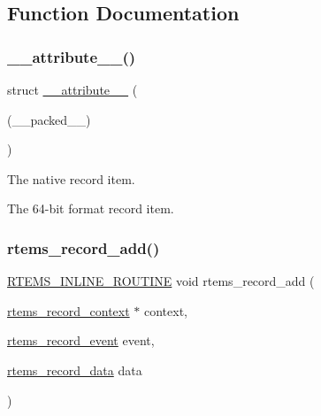 \subsection{Function Documentation}
\mbox{\label{group__RTEMSRecord_gad09246453a4dabd919c7541484046a87}} 
\subsubsection{\texorpdfstring{\_\_attribute\_\_()}{\_\_attribute\_\_()}}
{\footnotesize\ttfamily struct \mbox{\hyperlink{struct____attribute____}{\+\_\+\+\_\+attribute\+\_\+\+\_\+}} (\begin{DoxyParamCaption}\item[{(\+\_\+\+\_\+packed\+\_\+\+\_\+)}]{ }\end{DoxyParamCaption})}



The native record item. 

The 64-\/bit format record item. \mbox{\label{group__RTEMSRecord_ga5e164fc0a361be6cac976c3afa8ec732}} 
\subsubsection{\texorpdfstring{rtems\_record\_add()}{rtems\_record\_add()}}
{\footnotesize\ttfamily \mbox{\hyperlink{group__RTEMSScoreBaseDefs_gac216239df231d5dbd15e3520b0b9313f}{R\+T\+E\+M\+S\+\_\+\+I\+N\+L\+I\+N\+E\+\_\+\+R\+O\+U\+T\+I\+NE}} void rtems\+\_\+record\+\_\+add (\begin{DoxyParamCaption}\item[{\mbox{\hyperlink{structrtems__record__context}{rtems\+\_\+record\+\_\+context}} $\ast$}]{context,  }\item[{\mbox{\hyperlink{group__RTEMSRecord_gac748f47c13acd7d0595694ed7f19074b}{rtems\+\_\+record\+\_\+event}}}]{event,  }\item[{\mbox{\hyperlink{group__RTEMSRecord_gab483bd3ec735835dac6788b78c817eab}{rtems\+\_\+record\+\_\+data}}}]{data }\end{DoxyParamCaption})}



